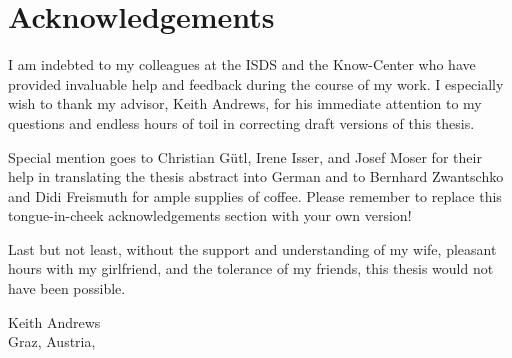 %
%
% 
% 
% 


\chapter*{Acknowledgements}


I am indebted to my colleagues at the ISDS and the Know-Center who
have provided invaluable help and feedback during the course of my
work.
%
I especially wish to thank my advisor, Keith Andrews, for his
immediate attention to my questions and endless hours of toil in
correcting draft versions of this thesis.

Special mention goes to
Christian Gütl,
Irene Isser, and
Josef Moser
for their help in translating the thesis abstract into German
and to
Bernhard Zwantschko and Didi Freismuth for ample supplies of coffee.
%
Please remember to replace this tongue-in-cheek acknowledgements
section with your own version!


Last but not least, without the support and understanding of my wife,
pleasant hours with my girlfriend, and the tolerance of my friends,
this thesis would not have been possible.

\vspace{2cm}


\begin{flushright}
Keith Andrews \\ {\small Graz, Austria, \thisdate}
\end{flushright}


